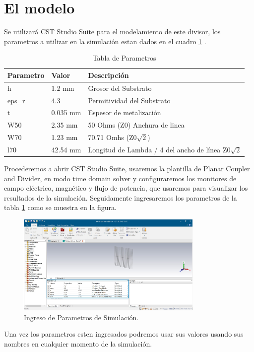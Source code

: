 \documentclass[a4paper]{IEEEtran} %
\begin{document}
\section{El modelo}
Se utilizará CST Studio Suite para el modelamiento de este divisor, los parametros a utilizar en la simulación estan dados en el cuadro \ref{tab:parametros_simulacion} \cite{cstpage}.
\begin{table}[h]
    \caption{Tabla de Parametros}
\begin{tabular}{@{}lll@{}}
\toprule
Parametro & Valor    & Descripción \\ \midrule
h         & 1.2 mm   & Grosor del Substrato \\
eps\_r    & 4.3      & Permitividad del Substrato \\
t         & 0.035 mm & Espesor de metalización \\ 
W50       & 2.35 mm  & 50 Ohms (Z0) Anchura de linea \\
W70       & 1.23 mm  & 70.71 Omhs (Z0$\sqrt{2}$) \\
l70       & 42.54 mm & Longitud de Lambda / 4 del ancho de línea Z0$\sqrt{2}$\\ \bottomrule
\end{tabular}
\label{tab:parametros_simulacion}
\end{table}

Procederemos a abrir CST Studio Suite, usaremos la plantilla de Planar Coupler and Divider, en modo time domain solver y configuraremos los monitores de campo eléctrico, magnético y flujo de potencia, que usaremos para visualizar los resultados de la simulación.
Seguidamente ingresaremos los parametros de la tabla \ref{tab:parametros_simulacion} como se muestra en la figura.

\begin{figure}[h]    
    \centering
        \includegraphics[width=9cm]{imagenes/img5}
        \caption{Ingreso de Parametros de Simulación.}
        \label{fig:ingreso_de_parametros}
\end{figure} 
Una vez los parametros esten ingresados podremos usar sus valores usando sus nombres en cualquier momento de la simulación.
\end{document}
